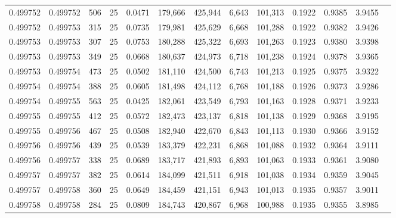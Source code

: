 \begin{tabular}{rrrrrrrrrrrrr}
0.499752 & 0.499752 &   506 &  25 &                                     0.0471 & 179,666 & 425,944 &   6,643 & 101,313 & 0.1922 & 0.9385 & 3.9455 \\
0.499752 & 0.499753 &   315 &  25 &                                     0.0735 & 179,981 & 425,629 &   6,668 & 101,288 & 0.1922 & 0.9382 & 3.9426 \\
0.499753 & 0.499753 &   307 &  25 &                                     0.0753 & 180,288 & 425,322 &   6,693 & 101,263 & 0.1923 & 0.9380 & 3.9398 \\
0.499753 & 0.499753 &   349 &  25 &                                     0.0668 & 180,637 & 424,973 &   6,718 & 101,238 & 0.1924 & 0.9378 & 3.9365 \\
0.499753 & 0.499754 &   473 &  25 &                                     0.0502 & 181,110 & 424,500 &   6,743 & 101,213 & 0.1925 & 0.9375 & 3.9322 \\
0.499754 & 0.499754 &   388 &  25 &                                     0.0605 & 181,498 & 424,112 &   6,768 & 101,188 & 0.1926 & 0.9373 & 3.9286 \\
0.499754 & 0.499755 &   563 &  25 &                                     0.0425 & 182,061 & 423,549 &   6,793 & 101,163 & 0.1928 & 0.9371 & 3.9233 \\
0.499755 & 0.499755 &   412 &  25 &                                     0.0572 & 182,473 & 423,137 &   6,818 & 101,138 & 0.1929 & 0.9368 & 3.9195 \\
0.499755 & 0.499756 &   467 &  25 &                                     0.0508 & 182,940 & 422,670 &   6,843 & 101,113 & 0.1930 & 0.9366 & 3.9152 \\
0.499756 & 0.499756 &   439 &  25 &                                     0.0539 & 183,379 & 422,231 &   6,868 & 101,088 & 0.1932 & 0.9364 & 3.9111 \\
0.499756 & 0.499757 &   338 &  25 &                                     0.0689 & 183,717 & 421,893 &   6,893 & 101,063 & 0.1933 & 0.9361 & 3.9080 \\
0.499757 & 0.499757 &   382 &  25 &                                     0.0614 & 184,099 & 421,511 &   6,918 & 101,038 & 0.1934 & 0.9359 & 3.9045 \\
0.499757 & 0.499758 &   360 &  25 &                                     0.0649 & 184,459 & 421,151 &   6,943 & 101,013 & 0.1935 & 0.9357 & 3.9011 \\
0.499758 & 0.499758 &   284 &  25 &                                     0.0809 & 184,743 & 420,867 &   6,968 & 100,988 & 0.1935 & 0.9355 & 3.8985 \\

\end{tabular}

